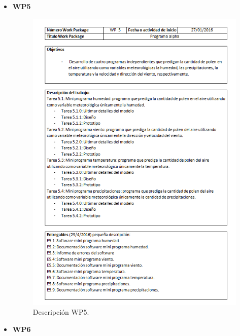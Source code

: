 \documentclass[12pt,oneside,a4paper]{article}
\numberwithin{figure}{section}
\begin{document}
\begin{itemize}
\item \textbf{WP5}

\begin{figure}[H]
\begin{center}
\includegraphics[scale=0.8]{WP5.png}
\caption{Descripción WP5.}
\label{fig:WP5}
\end{center}
\end{figure}
\clearpage

\item \textbf{WP6}


\end{itemize}
\end{document}
